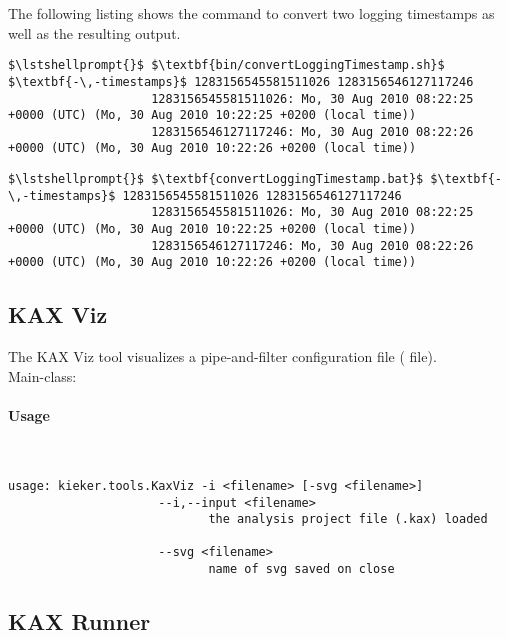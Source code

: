 				\noindent
				The following listing shows the command to convert two logging timestamps as well as the resulting output.

				\setTextListing
				\begin{lstlisting}[gobble = 10, caption=Execution under UNIX-like systems]
					$\lstshellprompt{}$ $\textbf{bin/convertLoggingTimestamp.sh}$ $\textbf{-\,-timestamps}$ 1283156545581511026 1283156546127117246 
					1283156545581511026: Mo, 30 Aug 2010 08:22:25 +0000 (UTC) (Mo, 30 Aug 2010 10:22:25 +0200 (local time))
					1283156546127117246: Mo, 30 Aug 2010 08:22:26 +0000 (UTC) (Mo, 30 Aug 2010 10:22:26 +0200 (local time))
				\end{lstlisting}

				\begin{lstlisting}[gobble = 10, caption=Execution under Windows]
					$\lstshellprompt{}$ $\textbf{convertLoggingTimestamp.bat}$ $\textbf{-\,-timestamps}$ 1283156545581511026 1283156546127117246 
					1283156545581511026: Mo, 30 Aug 2010 08:22:25 +0000 (UTC) (Mo, 30 Aug 2010 10:22:25 +0200 (local time))
					1283156546127117246: Mo, 30 Aug 2010 08:22:26 +0000 (UTC) (Mo, 30 Aug 2010 10:22:26 +0200 (local time))
				\end{lstlisting}
		
		\subsection{KAX Viz}
		
			The KAX Viz tool visualizes a \KiekerAnalysisPart{} pipe-and-filter configuration file ( file).\\

			\noindent Main-class: {\small {}}

			\paragraph*{Usage}\

				\setTextListing
				\begin{lstlisting}[gobble = 10]
					usage: kieker.tools.KaxViz -i <filename> [-svg <filename>]
					 --i,--input <filename>
							the analysis project file (.kax) loaded

					 --svg <filename>
							name of svg saved on close
				\end{lstlisting}
		
		\subsection{KAX Runner}
		
